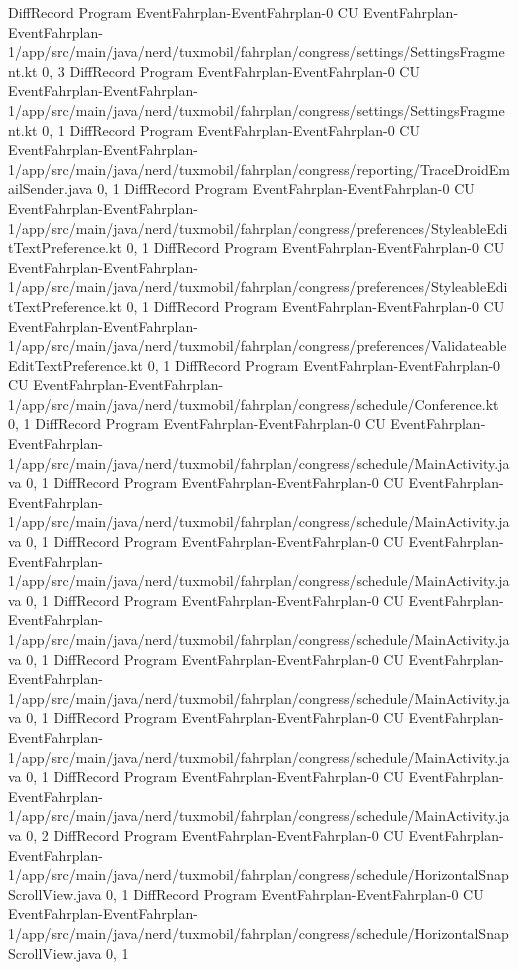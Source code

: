 DiffRecord Program EventFahrplan-EventFahrplan-0 CU EventFahrplan-EventFahrplan-1/app/src/main/java/nerd/tuxmobil/fahrplan/congress/settings/SettingsFragment.kt  {0, 3}
DiffRecord Program EventFahrplan-EventFahrplan-0 CU EventFahrplan-EventFahrplan-1/app/src/main/java/nerd/tuxmobil/fahrplan/congress/settings/SettingsFragment.kt  {0, 1}
DiffRecord Program EventFahrplan-EventFahrplan-0 CU EventFahrplan-EventFahrplan-1/app/src/main/java/nerd/tuxmobil/fahrplan/congress/reporting/TraceDroidEmailSender.java  {0, 1}
DiffRecord Program EventFahrplan-EventFahrplan-0 CU EventFahrplan-EventFahrplan-1/app/src/main/java/nerd/tuxmobil/fahrplan/congress/preferences/StyleableEditTextPreference.kt  {0, 1}
DiffRecord Program EventFahrplan-EventFahrplan-0 CU EventFahrplan-EventFahrplan-1/app/src/main/java/nerd/tuxmobil/fahrplan/congress/preferences/StyleableEditTextPreference.kt  {0, 1}
DiffRecord Program EventFahrplan-EventFahrplan-0 CU EventFahrplan-EventFahrplan-1/app/src/main/java/nerd/tuxmobil/fahrplan/congress/preferences/ValidateableEditTextPreference.kt  {0, 1}
DiffRecord Program EventFahrplan-EventFahrplan-0 CU EventFahrplan-EventFahrplan-1/app/src/main/java/nerd/tuxmobil/fahrplan/congress/schedule/Conference.kt  {0, 1}
DiffRecord Program EventFahrplan-EventFahrplan-0 CU EventFahrplan-EventFahrplan-1/app/src/main/java/nerd/tuxmobil/fahrplan/congress/schedule/MainActivity.java  {0, 1}
DiffRecord Program EventFahrplan-EventFahrplan-0 CU EventFahrplan-EventFahrplan-1/app/src/main/java/nerd/tuxmobil/fahrplan/congress/schedule/MainActivity.java  {0, 1}
DiffRecord Program EventFahrplan-EventFahrplan-0 CU EventFahrplan-EventFahrplan-1/app/src/main/java/nerd/tuxmobil/fahrplan/congress/schedule/MainActivity.java  {0, 1}
DiffRecord Program EventFahrplan-EventFahrplan-0 CU EventFahrplan-EventFahrplan-1/app/src/main/java/nerd/tuxmobil/fahrplan/congress/schedule/MainActivity.java  {0, 1}
DiffRecord Program EventFahrplan-EventFahrplan-0 CU EventFahrplan-EventFahrplan-1/app/src/main/java/nerd/tuxmobil/fahrplan/congress/schedule/MainActivity.java  {0, 1}
DiffRecord Program EventFahrplan-EventFahrplan-0 CU EventFahrplan-EventFahrplan-1/app/src/main/java/nerd/tuxmobil/fahrplan/congress/schedule/MainActivity.java  {0, 1}
DiffRecord Program EventFahrplan-EventFahrplan-0 CU EventFahrplan-EventFahrplan-1/app/src/main/java/nerd/tuxmobil/fahrplan/congress/schedule/MainActivity.java  {0, 2}
DiffRecord Program EventFahrplan-EventFahrplan-0 CU EventFahrplan-EventFahrplan-1/app/src/main/java/nerd/tuxmobil/fahrplan/congress/schedule/HorizontalSnapScrollView.java  {0, 1}
DiffRecord Program EventFahrplan-EventFahrplan-0 CU EventFahrplan-EventFahrplan-1/app/src/main/java/nerd/tuxmobil/fahrplan/congress/schedule/HorizontalSnapScrollView.java  {0, 1}
